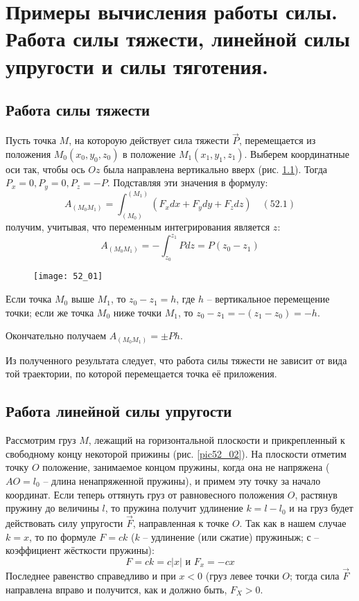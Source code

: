 \chapter{Примеры вычисления работы силы. Работа силы тяжести, линейной силы
упругости и силы тяготения.}

\section{Работа силы тяжести}
Пусть точка \( M \), на котороую действует сила тяжести \( \vec{P} \), 
перемещается из положения \( M_0(x_0, y_0, z_0) \) в положение 
\( M_1(x_1, y_1, z_1) \). Выберем координатные оси так, чтобы ось \( Oz \) 
была направлена вертикально вверх (рис. \ref{pic52_01}). Тогда 
\( P_x = 0, P_y = 0, P_z = -P \). Подставляя эти значения в формулу:
\[ 
    A_{(M_0 M_1)} = \int_{(M_0)}^{(M_1)} 
    \left( F_x dx + F_y dy + F_z dz \right) \quad (52.1)
\]
получим, учитывая, что переменным интегрирования является \( z \):
\[ 
    A_{(M_0 M_1)} = - \int_{z_0}^{z_1} Pdz = 
    P\left(z_0 - z_1 \right) 
\]

\begin{figure}[h!]
    \texttt{[image: 52\_01]}\hfill
    \parbox{.47\textwidth}{\caption{} \label{pic52_01}}
\end{figure}

Если точка \( M_0 \) выше \( M_1 \), то \( z_0 - z_1 = h \), где 
\( h \) -- вертикальное перемещение точки; если же точка \( M_0 \) ниже 
точки \( M_1 \), то \( z_0 - z_1 = -\left(z_1 - z_0\right) = -h \).

Окончательно получаем \( A_{(M_0 M_1)} = \pm Ph \).

Из полученного результата следует, что работа силы тяжести не зависит от 
вида той траектории, по которой перемещается точка её приложения.

\section{Работа линейной силы упругости}
Рассмотрим груз \( M \), лежащий на горизонтальной плоскости и 
прикрепленный к свободному концу некоторой прижины (рис. \ref{pic52_02}). На 
плоскости отметим точку \( O \) положение, занимаемое концом пружины, 
когда она не напряжена (\( AO = l_0 \) -- длина ненапряженной пружины), и 
примем эту точку за начало координат. Если теперь оттянуть груз от 
равновесного положения \( O \), растянув пружину до величины \( l \), то
пружина получит удлинение \( k = l - l_0 \) и на груз будет действовать 
силу упругости \( \vec{F} \), направленная к точке \( O \). Так как в 
нашем случае \( k = x \), то по формуле \( F = ck \) 
(\( k \) -- удлинение (или сжатие) пружиныж; \( с \) -- коэффициент 
жёсткости пружины):
\[ F = ck = c|x| \text{ и } F_x = -cx \]
Последнее равенство справедливо и при \( x < 0 \) 
(груз левее точки \( O \); тогда сила \( \vec{F} \) направлена вправо и 
получится, как и должно быть, \( F_X > 0 \).


